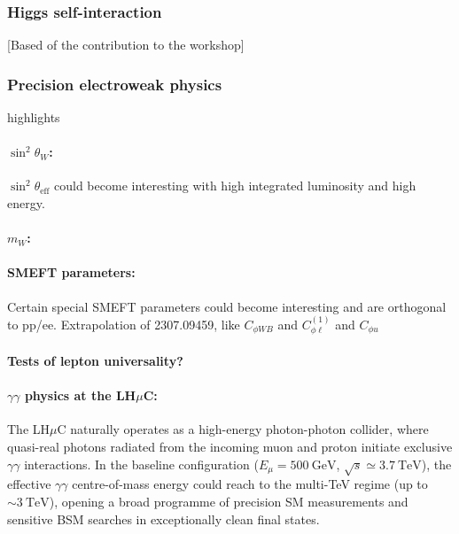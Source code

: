 \documentclass[a4paper,11pt]{article}
\begin{document}
\subsubsection{Higgs self-interaction}

[Based of the contribution to the workshop]

\subsubsection{Precision electroweak physics}


highlights



\paragraph{$\sin^2{\theta_W}$:}
$\sin^2{\theta_\text{eff}}$ could become interesting with high integrated luminosity and high energy.








\paragraph{$m_W$:}

\paragraph{SMEFT parameters:}
Certain special SMEFT parameters could become interesting and are orthogonal to pp/ee.
Extrapolation of 2307.09459, like $C_{\phi W B}$ and $C^{(1)}_{\phi \ell}$ and $C_{\phi u}$


\paragraph{Tests of lepton universality?}



\paragraph{$\gamma\gamma$ physics at the LH$\mu$C:}\label{paragraph:twophoton}

The LH$\mu$C naturally operates as a high-energy photon-photon collider, where quasi-real photons radiated 
from the incoming muon and proton initiate exclusive $\gamma\gamma$ interactions. 
In the baseline configuration ($E_\mu=500~\mathrm{GeV}$, $\sqrt{s}\simeq 3.7~\mathrm{TeV}$), 
the effective $\gamma\gamma$ centre-of-mass energy could reach to the multi-TeV regime (up to $\sim 3~\mathrm{TeV}$), 
opening a broad programme of precision SM measurements and sensitive BSM searches 
in exceptionally clean final states.
\end{document}
